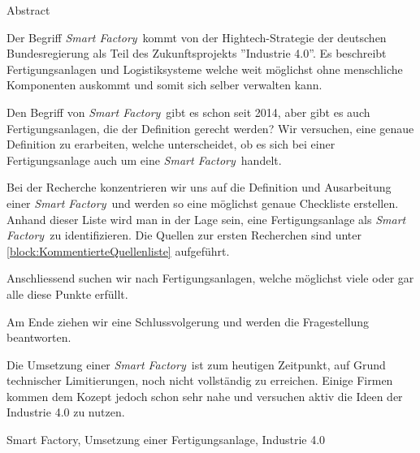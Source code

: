\documentclass{article}
\def\SmartFactory{\textcolor{DarkestGray}{\textit{Smart Factory}}}
\begin{document}
\begin{Map}{Abstract}

Der Begriff \SmartFactory\ kommt von der Hightech-Strategie der deutschen Bundesregierung als Teil des Zukunftsprojekts ''Industrie 4.0''\cite{WasIndustrie40}. Es beschreibt Fertigungsanlagen und Logistiksysteme welche weit möglichst ohne menschliche Komponenten auskommt und somit sich selber verwalten kann\cite{Industrie40TippsUmsetzung}.

Den Begriff von \SmartFactory\ gibt es schon seit 2014, aber gibt es auch Fertigungsanlagen, die der Definition gerecht werden?
Wir versuchen, eine genaue Definition zu erarbeiten, welche unterscheidet, ob es sich bei einer Fertigungsanlage auch um eine \SmartFactory\ handelt.

Bei der Recherche konzentrieren wir uns auf die Definition und Ausarbeitung einer \SmartFactory\ und werden so eine möglichst genaue Checkliste erstellen. Anhand dieser Liste wird man in der Lage sein, eine Fertigungsanlage als \SmartFactory\ zu identifizieren. Die Quellen zur ersten Recherchen sind unter \ref{block:KommentierteQuellenliste} aufgeführt. \par

Anschliessend suchen wir nach Fertigungsanlagen, welche möglichst viele oder gar alle diese Punkte erfüllt. \par

Am Ende ziehen wir eine Schlussvolgerung und werden die Fragestellung beantworten.

Die Umsetzung einer \SmartFactory\ ist zum heutigen Zeitpunkt, auf Grund technischer Limitierungen, noch nicht vollständig zu erreichen.
Einige Firmen kommen dem Kozept jedoch schon sehr nahe und versuchen aktiv die Ideen der Industrie 4.0 zu nutzen.

Smart Factory, Umsetzung einer Fertigungsanlage, Industrie 4.0


\end{Map}
\end{document}
